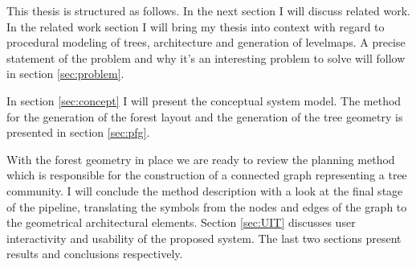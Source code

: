 This thesis is structured as follows. In the next section I will discuss related work. In the related work section I will bring my thesis into context with regard to procedural modeling of trees, architecture and generation of levelmaps. A precise statement of the problem and why it's an interesting problem to solve will follow in section \ref{sec:problem}. 

In section \ref{sec:concept} I will present the conceptual system model. The method for the generation of the forest layout and the generation of the tree geometry is presented in section \ref{sec:pfg}.  
 
With the forest geometry in place we are ready to review the planning method which is responsible for the construction of a connected graph representing a tree community. I will conclude the method description with a look at the final stage of the pipeline, translating the symbols from the nodes and edges of the graph to the geometrical architectural elements. Section \ref{sec:UIT} discusses user interactivity and usability of the proposed system. The last two sections present results and conclusions respectively.     
